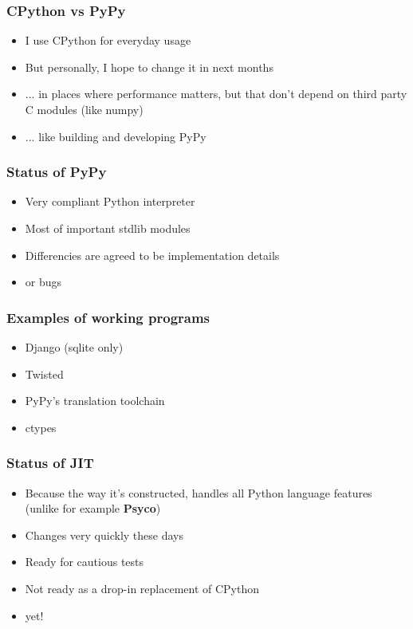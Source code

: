 \documentclass[utf8x]{beamer}
\begin{document}
\begin{frame}
  \frametitle{CPython vs PyPy}
  \begin{itemize}
    \item I use CPython for everyday usage
      \pause
    \item But personally, I hope to change it in next months
      \pause
    \item ... in places where performance matters, but that don't
      depend on third party C modules (like numpy)
      \pause
    \item ... like building and developing PyPy
  \end{itemize}
\end{frame}

\begin{frame}
  \frametitle{Status of PyPy}
  \begin{itemize}
    \item Very compliant Python interpreter
    \item Most of important stdlib modules
    \item Differencies are agreed to be implementation details
      \pause
    \item {\color{red} or bugs}
  \end{itemize}
\end{frame}

\begin{frame}
  \frametitle{Examples of working programs}
  \begin{itemize}
    \item Django (sqlite only)
    \item Twisted
    \item PyPy's translation toolchain
    \item ctypes
  \end{itemize}
\end{frame}

\begin{frame}
  \frametitle{Status of JIT}
  \begin{itemize}
    \item Because the way it's constructed, handles all Python language
      features (unlike for example {\bf Psyco})
    \item Changes very quickly these days
    \item Ready for cautious tests
    \item Not ready as a drop-in replacement of CPython
      \pause
    \item {\color{green} yet!}
  \end{itemize}
\end{frame}
\end{document}
